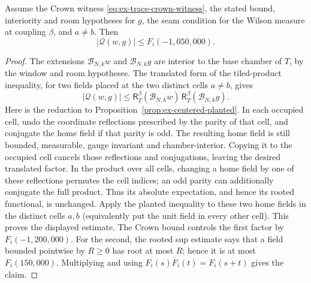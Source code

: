 \begin{lemma}
\label{lem:ex-trace-crown-good}
Assume the Crown witness \eqref{eq:ex-trace-crown-witness}, the stated
bound, interiority and room hypotheses for $g$, the seam condition for the
Wilson measure at coupling $\beta$, and $a\ne b$. Then
\[ |\mathcal Q(w,g)|\le F_i(-1{,}050{,}000).\]
\end{lemma}
\begin{proof}
The extensions $\mathcal B_{N,k}w$ and $\mathcal B_{N,k}g$ are interior to
the base chamber of $T$, by the window and room hypotheses. The translated
form of the tiled-product inequality, for two fields placed at the two
distinct cells $a\ne b$, gives
\[
 |\mathcal Q(w,g)|\le \mathsf R_T^\beta(\mathcal B_{N,k}w)\,
      \mathsf R_T^\beta(\mathcal B_{N,k}g).
\]
Here is the reduction to Proposition~\ref{prop:ex-centered-planted}.
In each occupied cell, undo the coordinate reflections prescribed by the
parity of that cell, and conjugate the home field if that parity is odd.
The resulting home field is still bounded, measurable, gauge invariant
and chamber-interior. Copying it to the occupied cell cancels those
reflections and conjugations, leaving the desired translated factor.
In the product over all cells, changing a home field by one of these
reflections permutes the cell indices; an odd parity can additionally
conjugate the full product. Thus its absolute expectation, and hence its
rooted functional, is unchanged. Apply the planted inequality to these
two home fields in the distinct cells $a,b$ (equivalently put the unit
field in every other cell). This proves the displayed estimate. The Crown bound controls the first factor by
$F_i(-1{,}200{,}000)$. For the second, the rooted sup estimate says
that a field bounded pointwise by $R\ge0$ has root at most $R$; hence it is at
most $F_i(150{,}000)$. Multiplying and using
$F_i(s)F_i(t)=F_i(s+t)$ gives the claim.
\end{proof}

